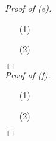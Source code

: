 \documentclass{article}
\begin{document}
\emph{Proof of (e).}
\begin{enumerate}
\item[(1)]
\item[(2)]

\end{enumerate}
$\Box$ \\



\emph{Proof of (f).}
\begin{enumerate}
\item[(1)]
\item[(2)]

\end{enumerate}
$\Box$ \\\\



\end{document}
